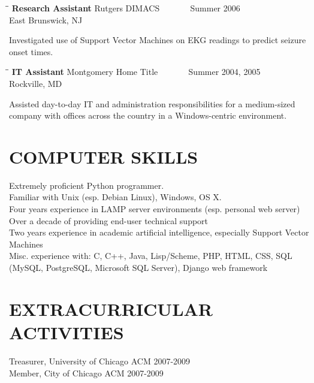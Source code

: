 \documentclass{res}
\begin{document}
\begin{resume}
   \begin{tabbing}%
   \hspace{2.3in}\= \hspace{2.6in}\= \kill %
   {\bf Research Assistant}  \>Rutgers DIMACS \> ~~~~~~ Summer 2006\\
                          \>East Brunswick, NJ
   \end{tabbing}\vspace{-20pt}
   Investigated use of Support Vector Machines on EKG readings to predict seizure onset times.
   \begin{tabbing}
   \hspace{2.3in}\= \hspace{2.6in}\= \kill %
    {\bf IT Assistant} \>Montgomery Home Title \> ~~~~~~ Summer 2004, 2005\\
                             \>Rockville, MD
   \end{tabbing}\vspace{-20pt}      %
   Assisted day-to-day IT and administration responsibilities for a medium-sized company with offices across the country in a Windows-centric environment. 


\section{COMPUTER SKILLS}          
    Extremely proficient Python programmer. \\
    Familiar with Unix (esp. Debian Linux), Windows, OS X.\\
    Four years experience in LAMP server environments (esp. personal web server)\\
    Over a decade of providing end-user technical support \\
    Two years experience in academic artificial intelligence, especially Support Vector Machines \\
    Misc. experience with: C, C++, Java, Lisp/Scheme, PHP, HTML, CSS, SQL (MySQL, PostgreSQL, Microsoft SQL Server), Django web framework

 
\section{EXTRACURRICULAR ACTIVITIES}          
    Treasurer, University of Chicago ACM 2007-2009 \\         
    Member, City of Chicago ACM 2007-2009
 
\end{resume}
\end{document}
